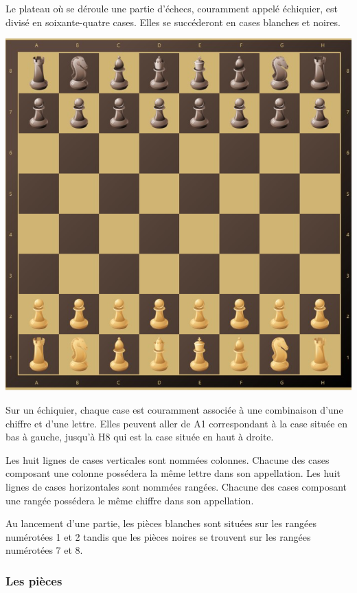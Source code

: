 \huge\documentclass{article}
\begin{document}
    Le plateau où se déroule une partie d'échecs, couramment appelé échiquier, est divisé en soixante-quatre cases. Elles se succéderont en cases blanches et noires.

    \centerline{\includegraphics[scale = 0.5]{img/Echiquier.png}}

    Sur un échiquier, chaque case est couramment associée à une combinaison d'une chiffre et d'une lettre. Elles peuvent aller de A1 correspondant à la case située en bas à gauche, jusqu'à H8 qui est la case située en haut à droite.

    Les huit lignes de cases verticales sont nommées colonnes. Chacune des cases composant une colonne possédera la même lettre dans son appellation. Les huit lignes de cases horizontales sont nommées rangées. Chacune des cases composant une rangée possédera le même chiffre dans son appellation.

    Au lancement d'une partie, les pièces blanches sont situées sur les rangées numérotées 1 et 2 tandis que les pièces noires se trouvent sur les rangées numérotées 7 et 8.

    \subsubsection{Les pièces}
\end{document}
